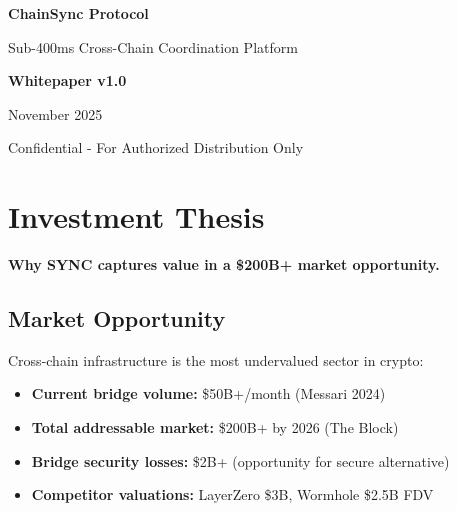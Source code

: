 \documentclass[12pt,a4paper]{article}
\begin{document}
\begin{titlepage}
\centering
\vspace*{2cm}
{\Huge\bfseries\color{primary} ChainSync Protocol\par}
\vspace{0.5cm}
{\Large Sub-400ms Cross-Chain Coordination Platform\par}
\vspace{2cm}
{\large\textbf{Whitepaper v1.0}\par}
\vspace{1cm}
{\large November 2025\par}
\vspace{3cm}

\begin{abstract}
ChainSync introduces a revolutionary cross-chain coordination protocol achieving sub-400ms latency through novel state oracle architecture and optimistic execution mechanisms. This whitepaper presents the technical architecture, tokenomics model, and utility framework that enables trustless, high-performance multi-chain operations. The SYNC token serves as the coordination layer for staking, governance, and fee distribution across the ecosystem.
\end{abstract}

\vfill
{\small Confidential - For Authorized Distribution Only\par}
\end{titlepage}

\tableofcontents
\newpage

\section{Investment Thesis}

\textbf{Why SYNC captures value in a \$200B+ market opportunity.}

\subsection{Market Opportunity}

Cross-chain infrastructure is the most undervalued sector in crypto:

\begin{itemize}
    \item \textbf{Current bridge volume:} \$50B+/month (Messari 2024)
    \item \textbf{Total addressable market:} \$200B+ by 2026 (The Block)
    \item \textbf{Bridge security losses:} \$2B+ (opportunity for secure alternative)
    \item \textbf{Competitor valuations:} LayerZero \$3B, Wormhole \$2.5B FDV
\end{itemize}
\end{document}
